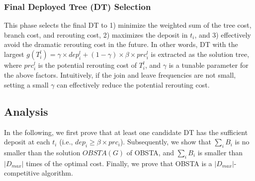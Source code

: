 \documentclass[10pt, conference, letterpaper]{IEEEtran}
\theoremstyle{definition}
\begin{document}





\subsubsection{Final Deployed Tree (DT) Selection}
This phase selects the final DT to 1) minimize the weighted sum of the tree cost, branch cost, and rerouting cost, 2) maximizes the deposit in $t_i$, and 3) effectively avoid the dramatic rerouting cost in the future. In other words, DT with the largest $g(T_i^{l})=\gamma \times dep_i^l
+ (1-\gamma) \times \beta\times prc_i^{l}$ is extracted as the solution tree,
where $prc_i^{l}$ is the potential rerouting cost of $T_{i}^{l}$, and $\gamma$ is a tunable parameter for the above factors. Intuitively, if the join and leave frequencies are not small, setting a small $\gamma$ can effectively reduce the potential rerouting cost.

\subsection{Analysis}
In the following, we first prove that at least one candidate DT has the sufficient deposit at each $t_i$ (i.e., $dep_i\geq \beta \times prc_i$). %
Subsequently, we show that $\sum_{i}{B_{i}}$ is no smaller than the solution $OBSTA(G)$ of OBSTA, and $\sum_{i}{B_{i}}$ is smaller than $|D_{max}|$ times of the optimal cost. %
Finally, we prove that OBSTA is a $|D_{max}|$-competitive algorithm.
\end{document}
